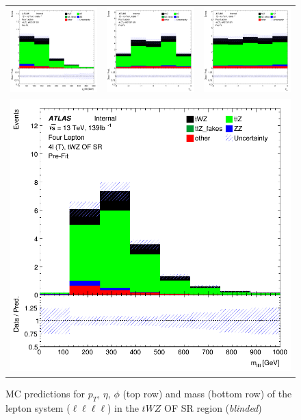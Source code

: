 \begin{figure}[htbp]
\centering
  \begin{tabular}{ccc}

    \includegraphics[width=.2\textwidth]{figures/PreFitPlots/lep4_tWZ_4T_OF_llll_sys_pt}&
    \includegraphics[width=.2\textwidth]{figures/PreFitPlots/lep4_tWZ_4T_OF_llll_sys_eta} &
    \includegraphics[width=.2\textwidth]{figures/PreFitPlots/lep4_tWZ_4T_OF_llll_sys_phi} \\
    \multicolumn{3}{c}{\includegraphics[width=.2\textwidth]{figures/PreFitPlots/lep4_tWZ_4T_OF_llll_sys_mass}}

  \end{tabular}
  \caption{MC predictions for $p_{T}$, $\eta$, $\phi$ (top row) and mass (bottom row) of the lepton system ($\ell \ell \ell \ell$) in the $tWZ$ OF SR region (\textit{blinded})}
  \label{fig:4lep-OF-SR-Lep-sys-Plots}
\end{figure}
\clearpage

